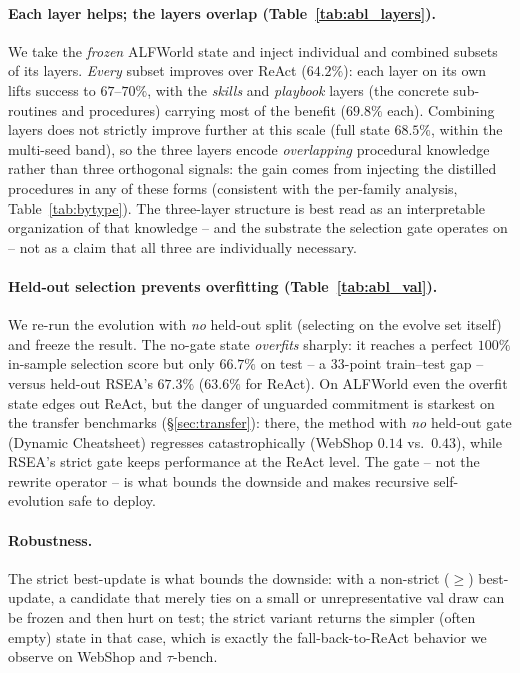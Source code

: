 \documentclass{article}
\begin{document}
\paragraph{Each layer helps; the layers overlap (Table~\ref{tab:abl_layers}).}
We take the \emph{frozen} ALFWorld state and inject individual and combined subsets
of its layers. \emph{Every} subset improves over ReAct ($64.2\%$): each layer on its
own lifts success to $67$--$70\%$, with the \emph{skills} and \emph{playbook} layers
(the concrete sub-routines and procedures) carrying most of the benefit ($69.8\%$
each). Combining layers does not strictly improve further at this scale (full state
$68.5\%$, within the multi-seed band), so the three layers encode \emph{overlapping}
procedural knowledge rather than three orthogonal signals: the gain comes from
injecting the distilled procedures in any of these forms (consistent with the
per-family analysis, Table~\ref{tab:bytype}). The three-layer structure is best read
as an interpretable organization of that knowledge -- and the substrate the
selection gate operates on -- not as a claim that all three are individually
necessary.

\paragraph{Held-out selection prevents overfitting (Table~\ref{tab:abl_val}).}
We re-run the evolution with \emph{no} held-out split (selecting on the evolve set
itself) and freeze the result. The no-gate state \emph{overfits} sharply: it reaches
a perfect $100\%$ in-sample selection score but only $66.7\%$ on test -- a $33$-point
train--test gap -- versus held-out RSEA's $67.3\%$ ($63.6\%$ for ReAct). On ALFWorld
even the overfit state edges out ReAct, but the danger of unguarded commitment is
starkest on the transfer benchmarks (\S\ref{sec:transfer}): there, the method with
\emph{no} held-out gate (Dynamic Cheatsheet) regresses catastrophically (WebShop
$0.14$ vs.\ $0.43$), while RSEA's strict gate keeps performance at the ReAct level.
The gate -- not the rewrite operator -- is what bounds the downside and makes
recursive self-evolution safe to deploy.

\paragraph{Robustness.} The strict best-update is what bounds the downside: with a
non-strict ($\ge$) best-update, a candidate that merely ties on a small or
unrepresentative val draw can be frozen and then hurt on test; the strict variant
returns the simpler (often empty) state in that case, which is exactly the
fall-back-to-ReAct behavior we observe on WebShop and $\tau$-bench.
\end{document}
